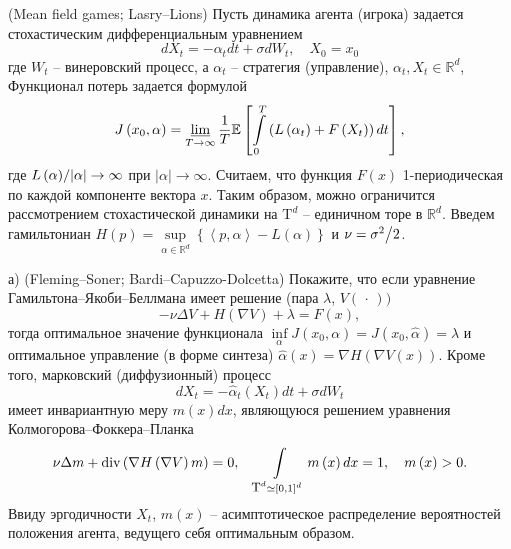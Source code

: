 \begin{problem}\DStar(Mean field games; Lasry--Lions)
\label{m_field_games}
Пусть динамика агента 
(игрока) задается стохастическим дифференциальным уравнением
\[
dX_t =-\alpha _t dt+\sigma dW_t ,
\quad
X_0 =x_0 
\]
где $W_t $ -- винеровский процесс, а $\alpha _t $ -- стратегия (управление), 
$\alpha _t ,X_t \in {\mathbb R}^d$, Функционал потерь задается формулой
\[
J\left( {x_0 ,\alpha } \right)=\mathop {\underline{\lim }}\limits_{T\to 
\infty } \frac{1}{T}\mathrm{{\mathbb E}}\left[ {\int\limits_0^T {\left( {L\left( {\alpha _t } 
\right)+F\left( {X_t } \right)} \right)dt} } \right],
\]
где ${L\left( \alpha \right)} \mathord{\left/ {\vphantom {{L\left( \alpha 
\right)} {\left| \alpha \right|}}} \right. \kern-\nulldelimiterspace} 
{\left| \alpha \right|}\to \infty $ при $\left| \alpha \right|\to \infty $. 
Считаем, что функция $F\left( x \right)$ 1-периодическая по каждой 
компоненте вектора $x$. Таким образом, можно ограничится рассмотрением 
стохастической динамики на $\mbox{T}^d$ -- единичном торе в ${\mathbb R}^d$. 
Введем гамильтониан $H\left( p \right)=\mathop {\sup }\limits_{\alpha \in 
{\mathbb R}^d} \left\{ {\left\langle {p,\alpha } \right\rangle -L\left( \alpha 
\right)} \right\}$ и $\nu ={\sigma ^2} \mathord{\left/ {\vphantom {{\sigma 
^2} 2}} \right. \kern-\nulldelimiterspace} 2$.

а) (Fleming--Soner; Bardi--Capuzzo-Dolcetta) Покажите, что 
если уравнение Гамильтона--Якоби--Беллмана имеет решение (пара $\lambda $, 
$V\left( {\,\cdot \,} \right))$
\[
-\nu \Delta V+H\left( {\nabla V} \right)+\lambda =F\left( x \right),
\]
тогда оптимальное значение функционала $\mathop {\inf }\limits_\alpha 
J\left( {x_0 ,\alpha } \right)=J\left( {x_0 ,\hat {\alpha }} \right)=\lambda 
$ и оптимальное управление (в форме синтеза) $\hat {\alpha }\left( x 
\right)=\nabla H\left( {\nabla V\left( x \right)} \right)$. Кроме того, 
марковский (диффузионный) процесс 
\[
dX_t =-\hat {\alpha }_t \left( {X_t } \right)dt+\sigma dW_t 
\] 
имеет инвариантную меру $m\left( x \right)dx$, 
являющуюся решением уравнения Колмогорова--Фоккера--Планка
\[
\nu \Delta m+\mbox{div}\left( {\nabla H\left( {\nabla V} \right)m} 
\right)=0,
\quad
\int\limits_{\small{\mbox{T}^d}\simeq \left[ {0,1} \right]^d} {m\left( x \right)dx} 
=1,
\quad
m\left( x \right)>0.
\]
Ввиду эргодичности $X_t $, $m\left( x \right)$ -- асимптотическое 
распределение вероятностей положения агента, ведущего себя оптимальным 
образом.


\end{problem}
